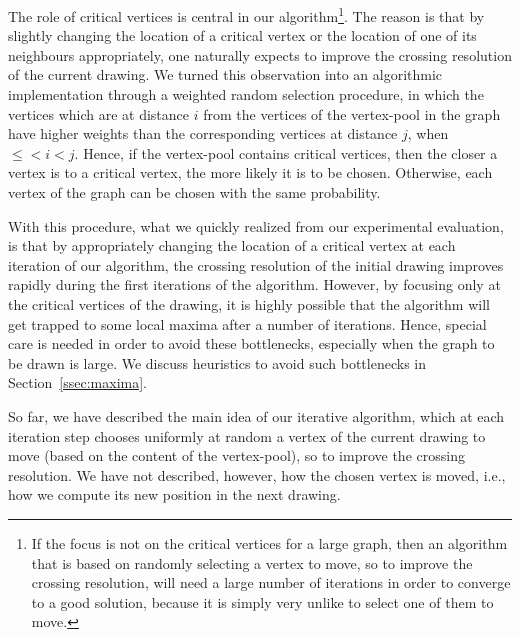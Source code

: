 \documentclass[runningheads]{llncs}
\begin{document}
The role of critical vertices is central in our algorithm\footnote{If the focus is not on the critical vertices for a large graph, then an algorithm that is based on randomly selecting a vertex to move, so to improve the crossing resolution, will need a large number of iterations in order to converge to a good solution, because it is simply very unlike to select one of them to move.}. The reason is that by slightly changing the location of a critical vertex or the location of one of its neighbours appropriately, one naturally expects to improve the crossing resolution of the current drawing. We turned this observation into an algorithmic implementation through a weighted random selection procedure, in which the vertices which are at distance $i$ from the vertices of the vertex-pool in the graph have higher weights than the corresponding vertices at distance $j$, when $ \leq <i<j$. Hence, if the vertex-pool contains critical vertices, then the closer a vertex is to a critical vertex, the more likely it is to be chosen. Otherwise, each vertex of the graph can be chosen with the same probability.

With this procedure, what we quickly realized from our experimental evaluation, is that by appropriately changing the location of a critical vertex at each iteration of our algorithm, the crossing resolution of the initial drawing improves rapidly during the first iterations of the algorithm. However, by focusing only at the critical vertices of the drawing, it is highly possible that the algorithm will get trapped to some local maxima after a number of iterations. Hence, special care is needed in order to avoid these bottlenecks, especially when the graph to be drawn is large. We discuss heuristics to avoid such bottlenecks in  Section~\ref{ssec:maxima}.

So far, we have described the main idea of our iterative algorithm, which at each iteration step chooses uniformly at random a vertex of the current drawing to move (based on the content of the vertex-pool), so to improve the crossing resolution. We have not described, however, how the chosen vertex is moved, i.e., how we compute its new position in the next drawing.  
\end{document}
